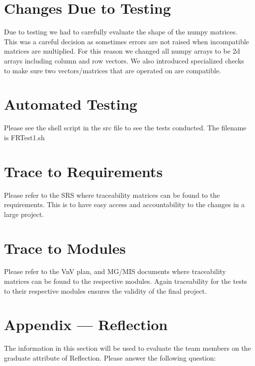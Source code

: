 \documentclass[12pt, titlepage]{article}
\begin{document}
\section{Changes Due to Testing}

Due to testing we had to carefully evaluate the shape of the numpy matrices. This was a careful decision as sometimes errors are not raised when incompatible matrices are multiplied. For this reason we changed all numpy arrays to be 2d arrays including column and row vectors. We also introduced specialized checks to make sure two vectors/matrices that are operated on are compatible.
\section{Automated Testing}
Please see the shell script in the src file to see the tests conducted. The filename is FRTest1.sh
\section{Trace to Requirements}
Please refer to the SRS \citep{SRS} where traceability matrices can be found to the requirements. This is to have easy access and accountability to the changes in a large project.
		
\section{Trace to Modules}
Please refer to the VnV plan, and MG/MIS documents \citep{SRS} where traceability matrices can be found to the respective modules. Again traceability for the tests to their respective modules ensures the validity of the final project.




\newpage{}
\section*{Appendix --- Reflection}

The information in this section will be used to evaluate the team members on the
graduate attribute of Reflection.  Please answer the following question:
\end{document}
